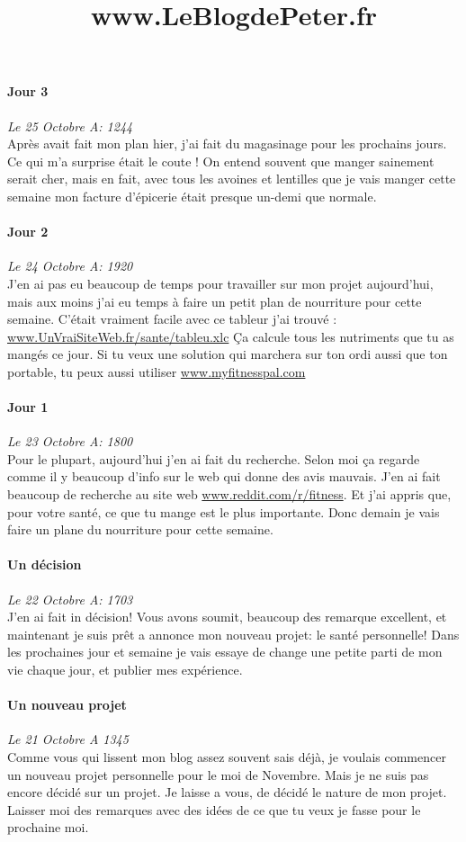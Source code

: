 \documentclass{article}
\begin{document}
\title{www.LeBlogdePeter.fr}


\paragraph{Jour 3} \emph{Le 25 Octobre A: 1244}\\
Après avait fait mon plan hier, j'ai fait du magasinage pour les prochains jours. Ce qui m'a surprise était le coute ! On entend souvent que manger sainement serait cher, mais en fait, avec tous les avoines et lentilles que je vais manger cette semaine mon facture d'épicerie était presque un-demi que normale.

\paragraph{Jour 2} \emph{Le 24 Octobre A: 1920}\\
J'en ai pas eu beaucoup de temps pour travailler sur mon projet aujourd'hui, mais aux moins j'ai eu temps à faire un petit plan de nourriture
pour cette semaine. C'était vraiment facile avec ce tableur j'ai trouvé : \underline{www.UnVraiSiteWeb.fr/sante/tableu.xlc} Ça calcule tous les nutriments que tu as mangés ce jour. Si tu veux une solution qui marchera sur ton ordi aussi que ton portable, tu peux aussi utiliser \underline{www.myfitnesspal.com}

\paragraph{Jour 1} \emph{Le 23 Octobre A: 1800}\\
Pour le plupart, aujourd'hui j'en ai fait du recherche. Selon moi ça regarde comme il y beaucoup d'info sur le web qui donne des avis mauvais.
J'en ai fait beaucoup de recherche au site web \underline{www.reddit.com/r/fitness}. Et j'ai appris que, pour votre santé, ce que tu mange est
le plus importante. Donc demain je vais faire un plane du nourriture pour cette semaine.

\paragraph{Un décision} \emph{Le 22 Octobre A: 1703}\\
J'en ai fait in décision!  Vous avons soumit, beaucoup des remarque excellent, et maintenant je suis prêt a annonce mon nouveau projet: le santé personnelle! Dans les prochaines jour et semaine je vais essaye de change une petite parti de mon vie chaque jour, et publier mes expérience.

\paragraph{Un nouveau projet} \emph{Le 21 Octobre A 1345} \\
Comme vous qui lissent mon blog assez souvent sais déjà, je voulais commencer un nouveau projet personnelle pour le moi de Novembre. Mais je ne suis pas encore décidé sur un projet. Je laisse a vous, de décidé le nature de mon projet. Laisser moi des remarques avec des idées de ce que tu veux je fasse pour le prochaine moi.
\end{document}
